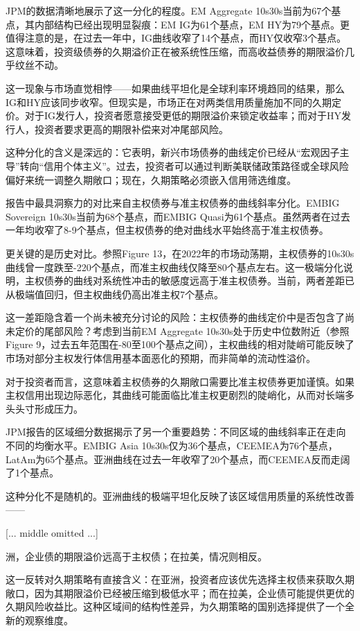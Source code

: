 \documentclass[11pt]{ctexart}
\begin{document}
JPM的数据清晰地展示了这一分化的程度。EM Aggregate 10s30s当前为67个基点，其内部结构已经出现明显裂痕：EM IG为61个基点，EM HY为79个基点。更值得注意的是，在过去一年中，IG曲线收窄了14个基点，而HY仅收窄3个基点。这意味着，投资级债券的久期溢价正在被系统性压缩，而高收益债券的期限溢价几乎纹丝不动。

这一现象与市场直觉相悖——如果曲线平坦化是全球利率环境趋同的结果，那么IG和HY应该同步收窄。但现实是，市场正在对两类信用质量施加不同的久期定价。对于IG发行人，投资者愿意接受更低的期限溢价来锁定收益率；而对于HY发行人，投资者要求更高的期限补偿来对冲尾部风险。

这种分化的含义是深远的：它表明，新兴市场债券的曲线定价已经从“宏观因子主导”转向“信用个体主义”。过去，投资者可以通过判断美联储政策路径或全球风险偏好来统一调整久期敞口；现在，久期策略必须嵌入信用筛选维度。

报告中最具洞察力的对比来自主权债券与准主权债券的曲线斜率分化。EMBIG Sovereign 10s30s当前为68个基点，而EMBIG Quasi为61个基点。虽然两者在过去一年均收窄了8-9个基点，但主权债券的绝对曲线水平始终高于准主权债券。

更关键的是历史对比。参照Figure 13，在2022年的市场动荡期，主权债券的10s30s曲线曾一度跌至-220个基点，而准主权曲线仅降至80个基点左右。这一极端分化说明，主权债券的曲线对系统性冲击的敏感度远高于准主权债券。当前，两者差距已从极端值回归，但主权曲线仍高出准主权7个基点。

这一差距隐含着一个尚未被充分讨论的风险：主权债券的曲线定价中是否包含了尚未定价的尾部风险？考虑到当前EM Aggregate 10s30s处于历史中位数附近（参照Figure 9，过去五年范围在-80至100个基点之间），主权曲线的相对陡峭可能反映了市场对部分主权发行体信用基本面恶化的预期，而非简单的流动性溢价。

对于投资者而言，这意味着主权债券的久期敞口需要比准主权债券更加谨慎。如果主权信用出现边际恶化，其曲线可能面临比准主权更剧烈的陡峭化，从而对长端多头头寸形成压力。

JPM报告的区域细分数据揭示了另一个重要趋势：不同区域的曲线斜率正在走向不同的均衡水平。EMBIG Asia 10s30s仅为36个基点，CEEMEA为76个基点，LatAm为65个基点。亚洲曲线在过去一年收窄了20个基点，而CEEMEA反而走阔了1个基点。

这种分化不是随机的。亚洲曲线的极端平坦化反映了该区域信用质量的系统性改善——

[... middle omitted ...]

洲，企业债的期限溢价远高于主权债；在拉美，情况则相反。

这一反转对久期策略有直接含义：在亚洲，投资者应该优先选择主权债来获取久期敞口，因为其期限溢价已经被压缩到极低水平；而在拉美，企业债可能提供更优的久期风险收益比。这种区域间的结构性差异，为久期策略的国别选择提供了一个全新的观察维度。
\end{document}
